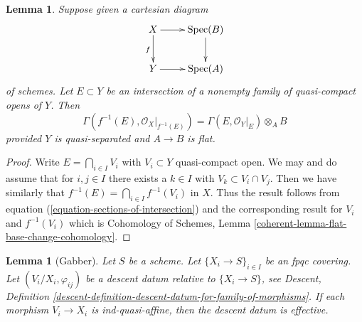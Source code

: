 \documentclass{stacks-project}
\theoremstyle{plain}
\newtheorem{lemma}[subsection]{Lemma}
\theoremstyle{definition}
\theoremstyle{remark}
\numberwithin{equation}{subsection}
\def\Spec{\mathop{\mathrm{Spec}}}
\begin{document}
\begin{lemma}
\label{lemma-affine-base-change}
Suppose given a cartesian diagram
$$
\xymatrix{
X \ar[d]_f \ar[r] & \Spec(B) \ar[d] \\
Y \ar[r] & \Spec(A)
}
$$
of schemes. Let $E \subset Y$ be an intersection of a nonempty family
of quasi-compact opens of $Y$. Then
$$
\Gamma(f^{-1}(E), \mathcal{O}_X|_{f^{-1}(E)}) =
\Gamma(E, \mathcal{O}_Y|_E) \otimes_A B
$$
provided $Y$ is quasi-separated and $A \to B$ is flat.
\end{lemma}

\begin{proof}
Write $E = \bigcap_{i \in I} V_i$ with $V_i \subset Y$ quasi-compact open.
We may and do assume that for $i, j \in I$ there exists a $k \in I$ with
$V_k \subset V_i \cap V_j$. Then we have similarly that
$f^{-1}(E) = \bigcap_{i \in I} f^{-1}(V_i)$ in $X$.
Thus the result follows from equation (\ref{equation-sections-of-intersection})
and the corresponding result for $V_i$ and $f^{-1}(V_i)$ which is
Cohomology of Schemes, Lemma \ref{coherent-lemma-flat-base-change-cohomology}.
\end{proof}

\begin{lemma}[Gabber]
\label{lemma-ind-quasi-affine}
Let $S$ be a scheme. Let $\{X_i \to S\}_{i\in I}$ be an fpqc covering.
Let $(V_i/X_i, \varphi_{ij})$ be a descent datum relative to
$\{X_i \to S\}$, see Descent, Definition
\ref{descent-definition-descent-datum-for-family-of-morphisms}. 
If each morphism $V_i \to X_i$ is ind-quasi-affine, then the descent datum
is effective.
\end{lemma}
\end{document}
